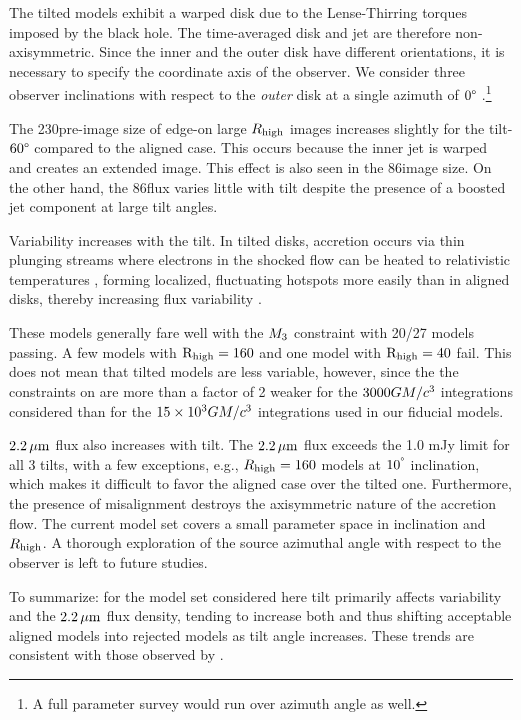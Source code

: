 The tilted models exhibit a warped disk due to the Lense-Thirring torques imposed by the black hole.
The time-averaged disk and jet are therefore non-axisymmetric.
Since the inner and the outer disk have different orientations, it is necessary to specify the coordinate axis of the observer.
We consider three  observer inclinations with respect to the {\em outer} disk at a single azimuth of $0\degree$ \citep[for more details, see][]{Chatterjee2020}.\footnote{A full parameter survey would run over azimuth angle as well.}

The 230\GHz pre-image size of edge-on large $R_\mathrm{high}$ images increases slightly for the tilt-$60\degree$ compared to the aligned case.
This occurs because the inner jet is warped and creates an extended image.
This effect is also seen in the 86\GHz image size.
On the other hand, the 86\GHz flux varies little with tilt despite the presence of a boosted jet component at large tilt angles.

Variability increases with the tilt.
In tilted disks, accretion occurs via thin plunging streams \citep[e.g.,][]{Fragile2007} where electrons in the shocked flow can be heated to relativistic temperatures \citep[e.g.,][]{Dexter2013, 2014ApJ...780...81G, White2019}, forming localized, fluctuating hotspots more easily than in aligned disks, thereby increasing flux variability \citep{Chatterjee2020, 2021arXiv210412896W}.

These models generally fare well with the $M_{3}$ constraint with 20/27 models passing.
A few models with $\rm R_{high}=160$ and one model with $\rm R_{high}=40$ fail.
This does not mean that tilted models are less variable, however, since the the constraints on  are more than a factor of 2 weaker for the $3000GM/c^3$ integrations considered than for the $15 \times 10^3GM/c^3$ integrations used in our fiducial models.

$2.2\,\mu\mathrm{m}$ flux also increases with tilt.
The $2.2\,\mu\mathrm{m}$ flux exceeds the 1.0 mJy limit for all 3 tilts, with a few exceptions, e.g., $R_{\rm high}=160$ models at $10^{\degree}$ inclination, which makes it difficult to favor the aligned case over the tilted one.
Furthermore, the presence of misalignment destroys the axisymmetric nature of the accretion flow.
The current model set covers a small parameter space in inclination and $R_{\rm high}$.
A thorough exploration of the source azimuthal angle with respect to the observer is left to future studies.

To summarize: for the model set considered here tilt primarily affects variability and the $2.2\,\mu\mathrm{m}$ flux density, tending to increase both and thus shifting acceptable aligned models into rejected models as tilt angle increases.
These trends are consistent with those observed by \cite{2021arXiv210412896W}.

